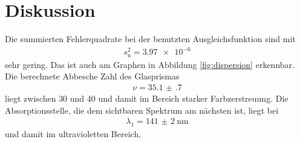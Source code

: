 \section{Diskussion}
\label{sec:Diskussion}

Die summierten Fehlerquadrate bei der benutzten Ausgleichsfunktion sind mit
\begin{align}
  s_\text{n}^2 = \num{3.97e-6}
\end{align}
sehr gering. Das ist auch am Graphen in Abbildung \ref{fig:dispersion} erkennbar.
Die berechnete Abbesche Zahl des Glasprismas
\begin{align}
  \nu = \num{35.1(7)}
\end{align}
liegt zwischen $30$ und $40$ und damit im Bereich starker Farbzerstreuung.
Die Absorptionsstelle, die dem sichtbaren Spektrum am nächsten ist, liegt
bei
\begin{align}
  \lambda_1 = \SI{141(2)}{\nano\meter}
\end{align}
und damit im ultravioletten Bereich.

